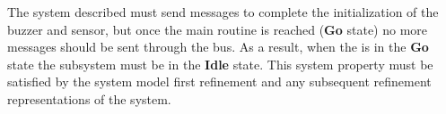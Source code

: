 The system described must send messages to complete the initialization of the buzzer and sensor, but once the main routine is reached (\textbf{Go} state) no more messages should be sent through the \SPI bus. As a result, when the \ASIC is in the \textbf{Go} state the \SPI subsystem must be in the \textbf{Idle} state. This system property must be satisfied by the system model first refinement and any subsequent refinement representations of the system.





